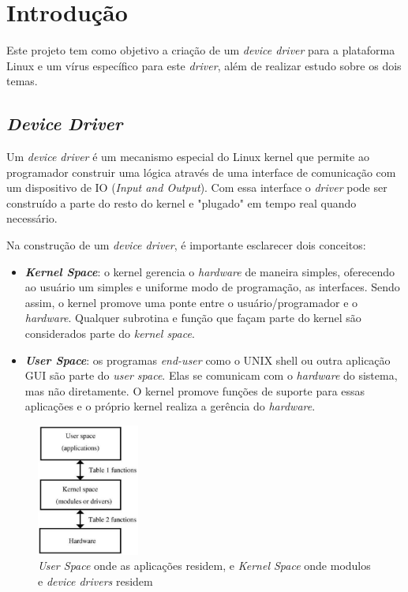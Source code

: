 \section{Introdução}

Este projeto tem como objetivo a criação de um \textit{device driver} para a
plataforma Linux e um vírus específico para este \textit{driver}, além de 
realizar estudo sobre os dois temas.

\subsection{\textit{Device Driver}}

Um \textit{device driver} é um mecanismo especial do Linux kernel que permite
ao programador construir uma lógica através de uma interface de comunicação
com um dispositivo de IO (\textit{Input and Output}). Com essa interface
o \textit{driver} pode ser construído a parte do resto do kernel e "plugado" em tempo
real quando necessário.

Na construção de um \textit{device driver}, é importante esclarecer dois conceitos:
\begin{itemize}
  \item \textit{\textbf{Kernel Space}}: o kernel gerencia o \textit{hardware} de maneira simples, oferecendo
    ao usuário um simples e uniforme modo de programação, as interfaces. Sendo assim,
    o kernel promove uma ponte entre o usuário/programador e o \textit{hardware}. Qualquer
    subrotina e função que façam parte do kernel são considerados parte do \textit{kernel space}.

  \item \textit{\textbf{User Space}}: os programas \textit{end-user} como o UNIX shell ou outra aplicação GUI são
    parte do \textit{user space}. Elas se comunicam com o \textit{hardware} do sistema, mas não diretamente.
    O kernel promove funções de suporte para essas aplicações e o próprio kernel realiza
    a gerência do \textit{hardware}.

\end{itemize}

\begin{figure}[H]
  \centering
  \caption{\textit{User Space} onde as aplicações residem, e \textit{Kernel Space} onde modulos e \textit{device drivers} residem }
  \label{fig:usblinux}
  \includegraphics[width=0.3\textwidth]{figure/kernel.eps}
\end{figure}


